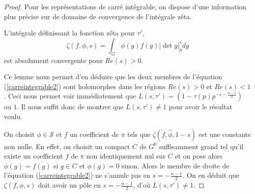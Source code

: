 \begin{proof}
Pour les représentations de carré intégrable, on dispose d'une information plus précise sur de domaine de convergence de l'intégrale zêta.
\begin{lemme}
L'intégrale définissant la fonction zêta pour $\tau'$,
\begin{equation}
\zeta(f, \phi, s) = \int_{G} \phi(g)f(g)|\det g|_p^s dg
\end{equation}
est absolument convergente pour $Re(s) > 0$.
\end{lemme}

Ce lemme nous permet d'en déduire que les deux membres de l'équation (\ref{carreintegrable2}) sont holomorphes dans les régions $Re(s) > 0$ et $Re(s) < 1$. Ceci nous permet voir immédiatement que $L(s, \tau') = (1-\tau(p)p^{-s-\frac{n-1}{2}})$ ou $1$. Il nous suffit donc de montrer que $L(s, \tau') \neq 1$ pour avoir le résultat voulu.

On choisit $\phi \in \mathcal{S}$ et $f$ un coefficient de $\pi$ tels que $\zeta(\check{f}, \hat{\phi}, 1-s)$ est une constante non nulle. En effet, on choisit un compact $C$ de $G^0$ suffisamment grand tel qu'il existe un coefficient $f$ de $\pi$ non identiquement nul sur $C$ et on pose alors $\phi(g) = \overline{f(g)}$ si $g \in C$ et $\phi(g)=0$ sinon. Alors le membre de droite de l'équation (\ref{carreintegrable2}) ne s'annule pas en $s=-\frac{n-1}{2}$. On en déduit que $\zeta(f, \phi, s)$ doit avoir un pôle en $s=-\frac{n-1}{2}$, d'où $L(s,\tau')\neq 1$.
\end{proof}